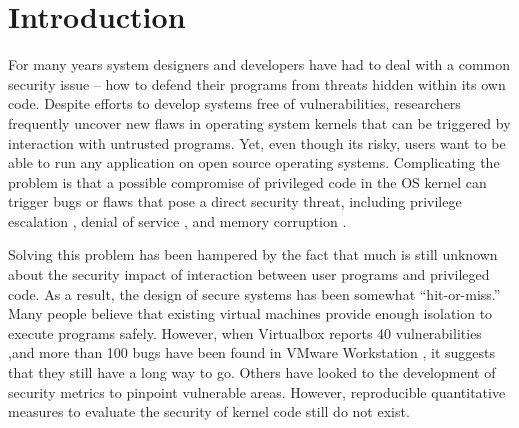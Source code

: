 \section{Introduction}
\label{sec.introduction}

For many years system designers and developers have had to deal with a common security issue --
how to defend their programs from threats hidden within its own code. Despite efforts
to develop systems free of vulnerabilities, researchers frequently uncover new flaws in
operating system kernels that can be triggered by interaction with untrusted programs.
Yet, even though its risky, users want to be able to run
 any application on open source operating systems. Complicating the problem is that
a possible compromise of privileged code in the OS kernel can trigger bugs or flaws that
pose a direct security threat, including privilege escalation \cite{CVE-2016-0728, CVE-2015-8660},
denial of service \cite{CVE-2015-8539, CVE-2015-5364}, and memory corruption \cite{CVE-2014-9529}.

Solving this problem has been hampered by the fact that much is still unknown about
 the security impact of interaction between user programs and privileged code.
As a result, the design of secure systems has been
somewhat ``hit-or-miss.'' Many people believe that existing virtual machines provide
enough isolation to execute programs safely. However, when Virtualbox reports 40 vulnerabilities
 \cite{Virtualbox-Vulnerabilities},and
 more than 100 bugs have been found in VMware Workstation \cite{VMWare-Vulnerabilities},
it suggests that they still have a long way to go.
Others have looked to the development of security metrics \cite{PittSFIeld, ozment2006milk}
 to pinpoint vulnerable areas.
However, reproducible quantitative measures to evaluate the security of kernel code still do not exist.

